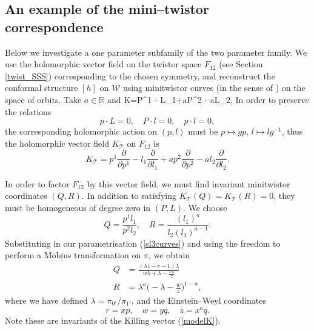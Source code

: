 \subsection{An example of the mini--twistor correspondence}
\label{mini_twistor}
Below we investigate a one parameter subfamily of the two parameter family. We use the holomorphic vector field on 
the twistor space
$F_{12}$  (see Section \ref{twist_SSS})
corresponding to the chosen symmetry, and reconstruct the conformal structure $[h]$ on $\mathcal{W}$ using minitwistor curves 
(in the sense of \cite{hitchin})
on the space of orbits. Take $a\in \mathbb{R}$ and
\be
\label{modelK}
K=P^1 - L_1+aP^2 - aL_2,
\ee
In order to preserve the relations
\[
p\cdot L=0,\quad P\cdot l=0,\quad p\cdot l=0, 
\]
the corresponding holomorphic action on $(p,l)$ must be $p\mapsto gp$, $l\mapsto lg^{-1}$, thus the holomorphic vector field $ K_\mathscr{T}$ on $F_{12}$ is
\[
 K_\mathscr{T}=p^1\frac{\partial}{\partial p^1} - l_1\frac{\partial}{\partial l_1}+ap^2\frac{\partial}{\partial p^2} - al_2\frac{\partial}{\partial l_2}.
\]

In order to factor $F_{12}$ by this vector field, we must find invariant minitwistor coordinates $(Q,R)$. In addition to satisfying $ K_\mathscr{T}(Q)= K_\mathscr{T}(R)=0$, they must be homogeneous of degree zero in $(P,L)$. We choose
\[
Q=\frac{p^1l_1}{p^2l_2},\quad R=\frac{(l_1)^a}{l_2(l_3)^{a-1}}.
\]
Substituting in our parametrisation (\ref{sl3curves}) and using the freedom to perform a Möbius transformation on $\pi$, we obtain
\begin{align}
\label{QR}
Q &= \frac{(\lambda z-r-1)\lambda}{w\lambda+\lambda-\frac{rw}{z}}\\
R &= \lambda^a\Big(-\lambda-\frac{w}{z}\Big)^{1-a},\nonumber
\end{align}
where we have defined $\lambda=\pi_{0'}/\pi_{1'}$, and the Einstein--Weyl coordinates
\[
r=xp,\quad w=yq, \quad z=x^aq.
\]
Note these are invariants of the Killing vector (\ref{modelK}).

